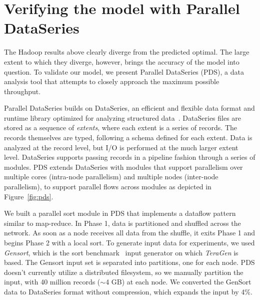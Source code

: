 \section{Verifying the model with Parallel DataSeries}
\label{sec:pds}

The Hadoop results above clearly diverge from the predicted optimal.
The large extent to which they diverge, however, brings the accuracy
of the model into question.  To validate our model, we present
Parallel DataSeries (PDS), a data analysis tool that attempts to
closely approach the maximum possible throughput.

 Parallel DataSeries builds on DataSeries, an
efficient and flexible data format and runtime library optimized for
analyzing structured data~\cite{dataseries}.  DataSeries files are
stored as a sequence of \emph{extents}, where each extent is a series
of records.  The records themselves are typed, following a schema
defined for each extent.  Data is analyzed at the record level, but
I/O is performed at the much larger extent level.  DataSeries supports
passing records in a pipeline fashion through a series of modules.
PDS extends DataSeries with modules that support parallelism over
multiple cores (intra-node parallelism) and multiple nodes (inter-node
parallelism), to support parallel flows across modules as depicted in
Figure~\ref{fig:pds}.




 We built a parallel sort module in PDS
that implements a dataflow pattern similar to map-reduce.
In Phase 1, data is
partitioned and shuffled across the network.
As soon as a node receives all data from the shuffle, it exits Phase 1 and
begins Phase 2 with a local sort.  To generate input data for
experiments, we used
\emph{Gensort}, which is the sort benchmark~\cite{sortbenchmark} input generator
on which \emph{TeraGen} is based. The Gensort input set is
separated into partitions, one for each node.
PDS doesn't currently utilize a distributed filesystem, so we
manually partition the input, with 40 million records ($\sim$4 GB) at
each node.  We converted the GenSort data to DataSeries format without
compression, which expands the input by 4\%.


